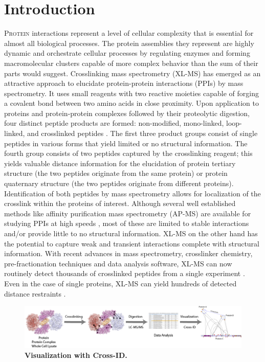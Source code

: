\section{Introduction}
\lettrine[lraise=0.1, nindent=0em, slope=-.5em]{P}{rotein}
interactions represent a level of cellular complexity that is essential for almost all biological processes. The protein assemblies they represent are highly dynamic and orchestrate cellular processes by regulating enzymes and forming macromolecular clusters capable of more complex behavior than the sum of their parts would suggest. Crosslinking mass spectrometry (XL-MS) has emerged as an attractive approach to elucidate protein-protein interactions (PPIs) by mass spectrometry. It uses small reagents with two reactive moieties capable of forging a covalent bond between two amino acids in close proximity. Upon application to proteins and protein-protein complexes followed by their proteolytic digestion, four distinct peptide products are formed: non-modified, mono-linked, loop-linked, and crosslinked peptides \cite{schilling2003ms}. The first three product groups consist of single peptides in various forms that yield limited or no structural information. The fourth group consists of two peptides captured by the crosslinking reagent; this yields valuable distance information for the elucidation of protein tertiary structure (the two peptides originate from the same protein) or protein quaternary structure (the two peptides originate from different proteins). Identification of both peptides by mass spectrometry allows for localization of the crosslink within the proteins of interest. Although several well established methods like affinity purification mass spectrometry (AP-MS) \cite{fagerlund2017spacer, benda2014structural, joachimiak2014structural, herzog2012structural, chen2010architecture, armony2016cross-linking} are available for studying PPIs at high speeds \cite{hosp2015double-barrel}, most of these are limited to stable interactions and/or provide little to no structural information. XL-MS on the other hand has the potential to capture weak and transient interactions complete with structural information. With recent advances in mass spectrometry, crosslinker chemistry, pre-fractionation techniques and data analysis software, XL-MS can now routinely detect thousands of crosslinked peptides from a single experiment \cite{kao2011development, liu2015proteome-wide, liu2017optimized, schweppe2017mitochondrial}. Even in the case of single proteins, XL-MS can yield hundreds of detected distance restraints \cite{belsom2017complementary}.
\begin{figure}[!htb]
  \center
  \includegraphics[]{Chapter.2/Figures/f1.png}
  \captionsetup{singlelinecheck = false, format= hang}
  \caption{\textbf{Visualization with Cross-ID.}}
  \label{fig:fig2.1}
\end{figure}

